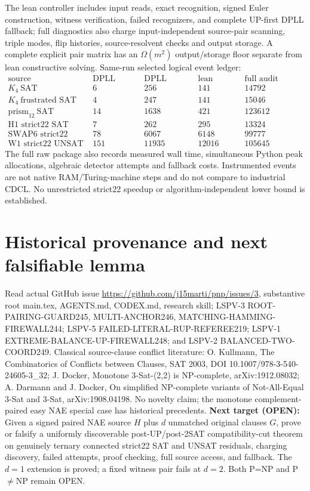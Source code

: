 \documentclass[10pt]{article}
\begin{document}
The lean controller includes input reads, exact recognition, signed Euler construction, witness verification, failed recognizers, and complete UP-first DPLL fallback; full diagnostics also charge input-independent source-pair scanning, triple modes, flip histories, source-resolvent checks and output storage. A complete explicit pair matrix has an $\Omega(m^2)$ output/storage floor separate from lean constructive solving. Same-run selected logical event ledger:
\[
\begin{array}{lrrrr}
\text{source} &\text{DPLL nodes}&\text{DPLL events}&\text{lean events}&\text{full audit events}\\
K_4\ \text{SAT}&6&256&141&14792\\
K_4\ \text{frustrated SAT}&4&247&141&15046\\
\text{prism}_{12}\ \text{SAT}&14&1638&421&123612\\
\text{H1 strict22 SAT}&7&262&295&13324\\
\text{SWAP6 strict22 SAT}&78&6067&6148&99777\\
\text{W1 strict22 UNSAT}&151&11935&12016&105645
\end{array}
\]
The full raw package also records measured wall time, simultaneous Python peak allocations, algebraic detector attempts and fallback costs. Instrumented events are not native RAM/Turing-machine steps and do not compare to industrial CDCL. No unrestricted strict22 speedup or algorithm-independent lower bound is established.

\section{Historical provenance and next falsifiable lemma}
Read actual GitHub issue \url{https://github.com/j15marti/pnp/issues/3}, substantive root main.tex, AGENTS.md, CODEX.md, research skill; LSPV-3 ROOT-PAIRING-GUARD245, MULTI-ANCHOR246, MATCHING-HAMMING-FIREWALL244; LSPV-5 FAILED-LITERAL-RUP-REFEREE219; LSPV-1 EXTREME-BALANCE-UP-FIREWALL248; and LSPV-2 BALANCED-TWO-COORD249. Classical source-clause conflict literature: O. Kullmann, The Combinatorics of Conflicts between Clauses, SAT 2003, DOI 10.1007/978-3-540-24605-3\_32; J. Docker, Monotone 3-Sat-(2,2) is NP-complete, arXiv:1912.08032; A. Darmann and J. Docker, On simplified NP-complete variants of Not-All-Equal 3-Sat and 3-Sat, arXiv:1908.04198. No novelty claim; the monotone complement-paired easy NAE special case has historical precedents.
\noindent\textbf{Next target (OPEN):} Given a signed paired NAE source $H$ plus $d$ unmatched original clauses $G$, prove or falsify a uniformly discoverable post-UP/post-2SAT compatibility-cut theorem on genuinely ternary connected strict22 SAT and UNSAT residuals, charging discovery, failed attempts, proof checking, full source access, and fallback. The $d=1$ extension is proved; a fixed witness pair fails at $d=2$. Both P=NP and P$\ne$NP remain OPEN.
\end{document}
